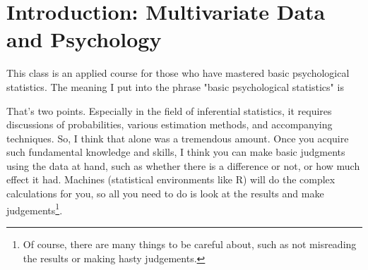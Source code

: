 \documentclass{ltjsbook}
\begin{document}
\chapter{Introduction: Multivariate Data and Psychology}
\label{x01_introduction}

This class is an applied course for those who have mastered basic psychological statistics. The meaning I put into the phrase "basic psychological statistics" is

That's two points. Especially in the field of inferential statistics, it requires discussions of probabilities, various estimation methods, and accompanying techniques. So, I think that alone was a tremendous amount.
Once you acquire such fundamental knowledge and skills, I think you can make basic judgments using the data at hand, such as whether there is a difference or not, or how much effect it had. Machines (statistical environments like R) will do the complex calculations for you, so all you need to do is look at the results and make judgements\footnote{Of course, there are many things to be careful about, such as not misreading the results or making hasty judgements.}.
\end{document}
